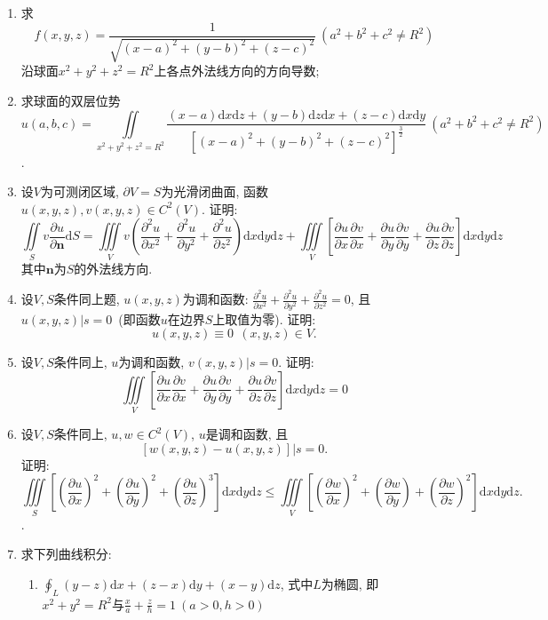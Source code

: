 \begin{enumerate}
	\item 求 $$ f(x,y,z) = \frac{1}{\sqrt{(x-a)^2+(y-b)^2+(z-c)^2} }\ (a^2+b^2+c^2\ne R^2)$$ 沿球面$x^2+y^2+z^2=R^2$上各点外法线方向的方向导数;
	\item 求球面的双层位势$$u(a,b,c)=\displaystyle{\iint\limits_{x^2+y^2+z^2=R^2}\frac{(x-a)\mathrm{d}x\mathrm{d}z+(y-b)\mathrm{d}z\mathrm{d}x+(z-c)\mathrm{d}x\mathrm{d}y}{[(x-a)^2+(y-b)^2+(z-c)^2]^{\frac{3}{2}}}}\ (a^2+b^2+c^2\ne R^2)$$.
	\item 设$V$为可测闭区域, $\partial V=S$为光滑闭曲面, 函数$u(x,y,z),v(x,y,z)\in C^2(V)$. 证明: 
	$$ \displaystyle{\iint\limits_{S}v\frac{\partial u}{\partial \bm{n}}\mathrm{d}S}=\iiint\limits_{V}v
	(\frac{\partial^2 u}{\partial x^2}+\frac{\partial^2 u}{\partial y^2}+\frac{\partial^2 u}{\partial z^2})
	\mathrm{d}x\mathrm{d}y\mathrm{d}z+\iiint\limits_{V}\left[\frac{\partial u}{\partial x}
	\frac{\partial v}{\partial x}+\frac{\partial u}{\partial y}\frac{\partial v}{\partial y}+\frac{\partial u}{\partial z}
	\frac{\partial v}{\partial z}\right]\mathrm{d}x\mathrm{d}y\mathrm{d}z$$
	其中$\bm{n}$为$S$的外法线方向.
	\item 设$V,S$条件同上题, $u(x,y,z)$为调和函数: $\frac{\partial^2u}{\partial x^2}+\frac{\partial^2 u}{\partial y^2}+\frac{\partial^2 u}{\partial z^2}=0$, 且$u(x,y,z)|s=0$\ (即函数$u$在边界$S$上取值为零). 证明:
	$$ u(x,y,z) \equiv 0\ \ (x,y,z)\in V.$$
	\item 设$V,S$条件同上, $u$为调和函数, $v(x,y,z)|s=0$. 证明:
	$$ \displaystyle{\iiint\limits_{V}\left[\frac{\partial u}{\partial x}\frac{\partial v}{\partial x}+
	\frac{\partial u}{\partial y}\frac{\partial v}{\partial y}+\frac{\partial u}{\partial z}\frac{\partial v}{\partial z}\right]\mathrm{d}x\mathrm{d}y\mathrm{d}z}=0$$
	\item 设$V,S$条件同上, $u, w\in C^2(V)$, $u$是调和函数, 且$$ [w(x,y,z)-u(x,y,z)]|s=0.$$
	证明:
 $$\displaystyle{
		\iiint\limits_{S}\left[\left(\frac{\partial u}{\partial x}\right)^2+\left(\frac{\partial u}{\partial y}\right)^2+\left(\frac{\partial u}{\partial z}\right)^3\right]\mathrm{d}x\mathrm{d}y\mathrm{d}z \le \iiint\limits_{V}\left[\left(\frac{\partial w}{\partial x}\right)^2+\left(\frac{\partial w}{\partial y}\right)+
	\left(\frac{\partial w}{\partial z}\right)^2\right]\mathrm{d}x\mathrm{d}y\mathrm{d}z.}$$.
	\item 求下列曲线积分:
	\begin{enumerate}
	\item $\displaystyle{\oint_{L}(y-z)\mathrm{d}x+(z-x)\mathrm{d}y+(x-y)\mathrm{d}z}$, 式中$L$为椭圆, 即$x^2+y^2=R^2$与$\frac{x}{a}+\frac{z}{h}=1\ (a>0,h>0)$

\end{enumerate}
\end{enumerate}
